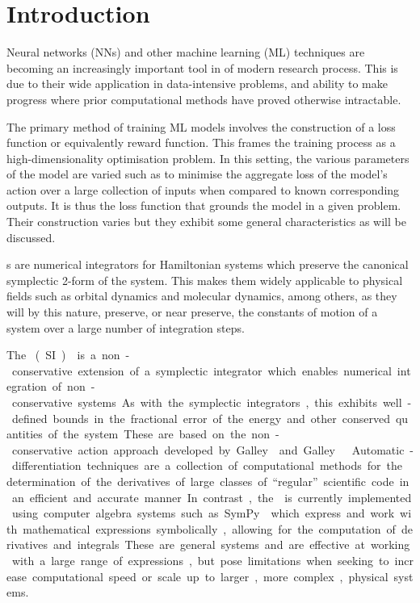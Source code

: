 \section{Introduction}

Neural networks (NNs) and other machine learning (ML) techniques are becoming an increasingly important tool in of modern research process. This is due to their wide application in data-intensive problems, and ability to make progress where prior computational methods have proved otherwise intractable.

The primary method of training ML models involves the construction of a loss function or equivalently reward function. This frames the training process as a high-dimensionality optimisation problem. In this setting, the various parameters of the model are varied such as to minimise the aggregate loss of the model's action over a large collection of inputs when compared to known corresponding outputs. It is thus the loss function that grounds the model in a given problem. Their construction varies but they exhibit some general characteristics as will be discussed.

\SymI{}s are numerical integrators for Hamiltonian systems which preserve the canonical symplectic 2-form of the system. 
This makes them widely applicable to physical fields such as orbital dynamics and  molecular dynamics, among others,%
 as they will by this nature, preserve, or near preserve, the constants of motion of a system over a large number of integration steps.

The \SI{} (SI)\cite{tsangSLIMPLECTICINTEGRATORSVARIATIONAL2015} is a non-conservative extension of a symplectic integrator which enables numerical integration of non-conservative systems. As with the symplectic integrators, this exhibits well-defined bounds in the fractional error of the energy and other conserved quantities of the system. These are based on the non-conservative action approach developed by Galley \cite{galleyClassicalMechanicsNonconservative2013} and Galley \etall \cite{galleyPrincipleStationaryNonconservative2014}.

Automatic-differentiation techniques are a collection of computational methods for the determination of the derivatives of large classes of \enquote{regular} scientific code in an efficient and accurate manner. In contrast, the \SI{} is currently implemented using computer algebra systems such as SymPy \cite{sympy} which express and work with mathematical expressions symbolically, allowing for the computation of derivatives and integrals. These are general systems and are effective at working with a large range of expressions, but pose limitations when seeking to increase computational speed or scale up to larger, more complex, physical systems.

